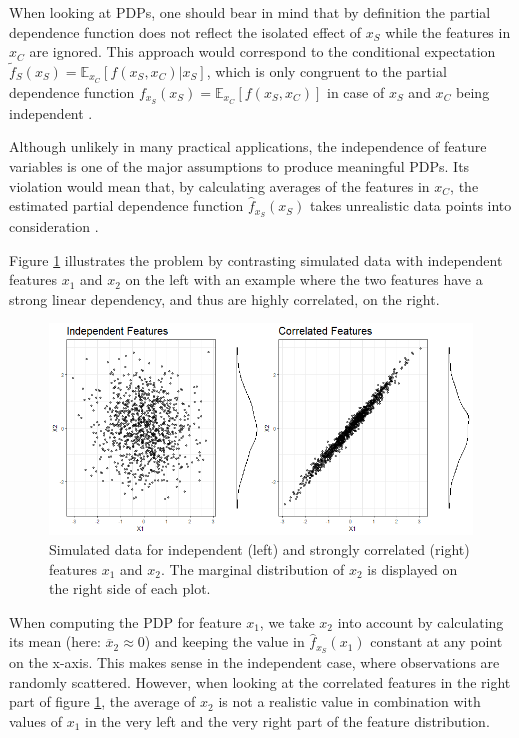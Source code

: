 \documentclass[]{krantz}
\begin{document}
When looking at PDPs, one should bear in mind that by definition the
partial dependence function does not reflect the isolated effect of
\(x_S\) while the features in \(x_C\) are ignored. This approach would
correspond to the conditional expectation
\(\tilde{f}_S(x_S) = \mathbb{E}_{x_C}[f(x_S, x_C)|x_S]\), which is only
congruent to the partial dependence function
\(f_{x_S}(x_S) = \mathbb{E}_{x_C}[f(x_S, x_C)]\) in case of \(x_S\) and
\(x_C\) being independent \citep{hastie2013elements}.

Although unlikely in many practical applications, the independence of
feature variables is one of the major assumptions to produce meaningful
PDPs. Its violation would mean that, by calculating averages of the
features in \(x_C\), the estimated partial dependence function
\(\hat{f}_{x_S}(x_S)\) takes unrealistic data points into consideration
\citep{molnar2019}.

Figure \ref{fig:Figure01} illustrates the problem by contrasting
simulated data with independent features \(x_1\) and \(x_2\) on the left
with an example where the two features have a strong linear dependency,
and thus are highly correlated, on the right.

\begin{figure}
\includegraphics[width=1\linewidth]{images/VK_PDP_1_Data_ind_dep} \caption{Simulated data for independent (left) and strongly correlated (right) features $x_1$ and $x_2$. The marginal distribution of $x_2$ is displayed on the right side of each plot.}\label{fig:Figure01}
\end{figure}

When computing the PDP for feature \(x_1\), we take \(x_2\) into account
by calculating its mean (here: \(\overline{x}_2 \approx 0\)) and keeping
the value in \(\hat{f}_{x_S}(x_1)\) constant at any point on the x-axis.
This makes sense in the independent case, where observations are
randomly scattered. However, when looking at the correlated features in
the right part of figure \ref{fig:Figure01}, the average of \(x_2\) is
not a realistic value in combination with values of \(x_1\) in the very
left and the very right part of the feature distribution.
\end{document}
